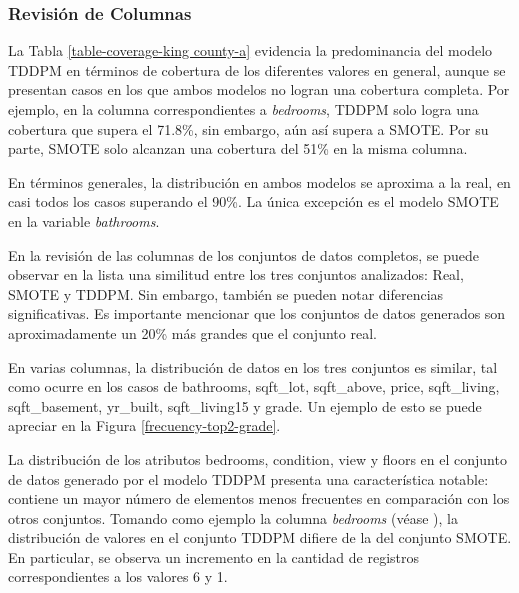 \newpage
\subsubsection{Revisión de Columnas}
La Tabla \ref{table-coverage-king county-a} evidencia la predominancia del modelo TDDPM en términos de cobertura de los diferentes valores en general, aunque se presentan casos en los que ambos modelos no logran una cobertura completa. Por ejemplo, en la columna correspondientes a \emph{bedrooms}, TDDPM solo logra una cobertura que supera el 71.8\%, sin embargo, aún así supera a SMOTE. Por su parte, SMOTE solo alcanzan una cobertura del 51\% en la misma columna.




\newpage
En términos generales, la distribución en ambos modelos se aproxima a la real, en casi todos los casos superando el 90\%. La única excepción es el modelo SMOTE en la variable \emph{bathrooms}.



En la revisión de las columnas de los conjuntos de datos completos, se puede observar en la lista  una similitud entre los tres conjuntos analizados: Real, SMOTE y TDDPM. Sin embargo, también se pueden notar diferencias significativas. Es importante mencionar que los conjuntos de datos generados son aproximadamente un 20\% más grandes que el conjunto real.

En varias columnas, la distribución de datos en los tres conjuntos es similar, tal como ocurre en los casos de bathrooms, sqft\_lot, sqft\_above, price, sqft\_living, sqft\_basement, yr\_built, sqft\_living15 y grade. Un ejemplo de esto se puede apreciar en la Figura \ref{frecuency-top2-grade}.




La distribución de los atributos bedrooms, condition, view y floors en el conjunto de datos generado por el modelo TDDPM presenta una característica notable: contiene un mayor número de elementos menos frecuentes en comparación con los otros conjuntos. Tomando como ejemplo la columna \emph{bedrooms} (véase ), la distribución de valores en el conjunto TDDPM difiere de la del conjunto SMOTE. En particular, se observa un incremento en la cantidad de registros correspondientes a los valores 6 y 1.



